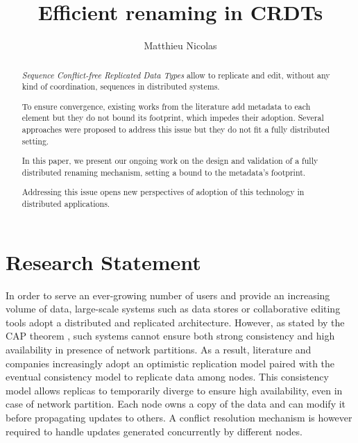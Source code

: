 \documentclass[sigplan]{acmart}
\begin{document}
\title{Efficient renaming in \acp{CRDT}}
\author{Matthieu Nicolas}

\renewcommand{\shortauthors}{M. Nicolas}

\begin{abstract}
    \emph{Sequence Conflict-free Replicated Data Types} allow to replicate and edit, without any kind of coordination, sequences in distributed systems.

    To ensure convergence, existing works from the literature add metadata to each element but they do not bound its footprint, which impedes their adoption.
    Several approaches were proposed to address this issue but they do not fit a fully distributed setting.

    In this paper, we present our ongoing work on the design and validation of a fully distributed renaming mechanism, setting a bound to the metadata's footprint.

    Addressing this issue opens new perspectives of adoption of this technology in distributed applications.
\end{abstract}

\maketitle

\section{Research Statement}

In order to serve an ever-growing number of users and provide an increasing volume of data,
large-scale systems such as data stores or collaborative editing tools adopt a distributed and replicated architecture.
However, as stated by the CAP theorem \cite{brewer_2000_podc}, such systems cannot ensure both strong consistency and high availability in presence of network partitions.
As a result, literature and companies increasingly adopt an optimistic replication model \cite{saito_2005_optimistic-replication} paired with the eventual consistency model to replicate data among nodes.
This consistency model allows replicas to temporarily diverge to ensure high availability, even in case of network partition.
Each node owns a copy of the data and can modify it before propagating updates to others.
A conflict resolution mechanism is however required to handle updates generated concurrently by different nodes.
\end{document}
